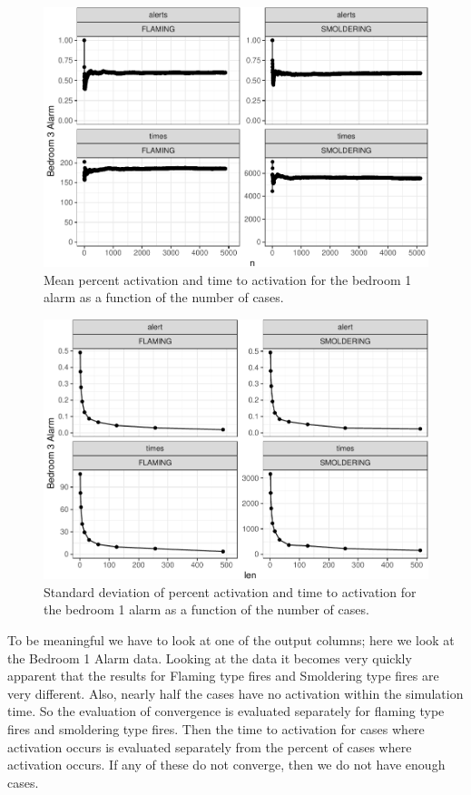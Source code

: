 \documentclass[12pt,twoside]{book}
\begin{document}
\begin{figure}[h!]
\centering
\includegraphics[width=4.5in]{FIGURES/converg-1.pdf}
\caption{Mean percent activation and time to activation for the bedroom 1 alarm as a function of the number of cases.}
\label{Ex_3-convergence_of_mean}
\end{figure}
\begin{figure}[h!]
\centering
\includegraphics[width=4.5in]{FIGURES/converg-2.pdf}
\caption{Standard deviation of percent activation and time to activation for the bedroom 1 alarm as a function of the number of cases.}
\label{Ex_3-standard_error}
\end{figure}

To be meaningful we have to look at one of the output columns; here we look at the Bedroom 1 Alarm data. Looking at the data it becomes very quickly apparent that the results for Flaming type fires and Smoldering type fires are very different. Also, nearly half the cases have no activation within the simulation time. So the evaluation of convergence is evaluated separately for flaming type fires and smoldering type fires. Then the time to activation for cases where activation occurs is evaluated separately from the percent of cases where activation occurs. If any of these do not converge, then we do not have enough cases.
\end{document}
